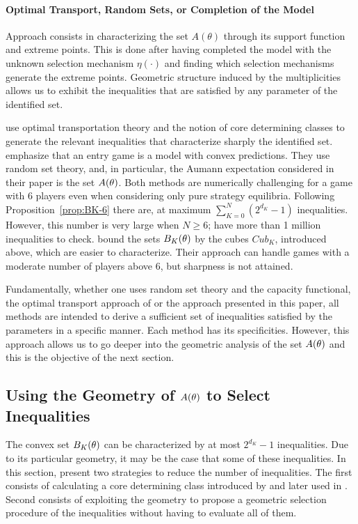 \paragraph{Optimal Transport, Random Sets, or Completion of the Model} Approach consists in characterizing the set $A(\theta)$ through its support function and extreme points. This is done after having completed the model with the unknown selection mechanism $\eta(\cdot)$ and finding which selection mechanisms generate the extreme points. Geometric structure induced by the multiplicities allows us to exhibit the inequalities that are satisfied by any parameter of the identified set. 

\citet{GH-2011} use optimal transportation theory and the notion of core determining classes to generate the relevant inequalities that characterize sharply the identified set. \citet{BMM-2011} emphasize that an entry game is a model with convex predictions. They use random set theory, and, in particular, the Aumann expectation considered in their paper is the set $A(\theta)$. Both methods are numerically challenging for a game with 6 players even when considering only pure strategy equilibria. Following Proposition~\ref{prop:BK-6} there are, at maximum $\sum_{K=0}^N (2^{d_K} - 1)$ inequalities. However, this number is very large when $N\geq 6$; have more than 1 million inequalities to check. \citet{CT-2009} bound the sets $B_K(\theta)$ by the cubes $Cub_K$, introduced above, which are easier to characterize. Their approach can handle games with a moderate number of players above 6, but sharpness is not attained. 

Fundamentally, whether one uses random set theory and the capacity functional, the optimal transport approach of \citet{GH-2011} or the approach presented in this paper, all methods are intended to derive a sufficient set of inequalities satisfied by the parameters in a specific manner. Each method has its specificities. However, this approach allows us to go deeper into the geometric analysis of the set $A(\theta)$ and this is the objective of the next section. 

\subsection{Using the Geometry of \texorpdfstring{$A(\theta)$}{} to Select Inequalities}

The convex set $B_K(\theta)$ can be characterized by at most $2^{d_K} - 1$ inequalities. Due to its particular geometry, it may be the case that some of these inequalities. In this section, present two strategies to reduce the number of inequalities. The first consists of calculating a core determining class introduced by \citet{GH-2011} and later used in \citet{CR-2017}. Second consists of exploiting the geometry to propose a geometric selection procedure of the inequalities without having to evaluate all of them. 

